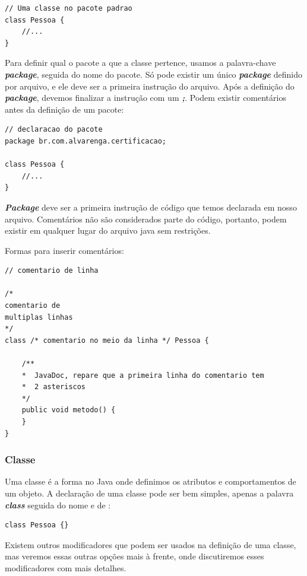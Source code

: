 \documentclass[12pt]{article}
\begin{document}
\begin{lstlisting}
// Uma classe no pacote padrao
class Pessoa {
	//...
}
\end{lstlisting}

Para definir qual o pacote a que a classe pertence, usamos a palavra-chave \textbf{\textit{package}}, seguida do nome do pacote. Só pode existir um único \textbf{\textit{package}} definido por arquivo, e ele deve ser a primeira instrução do arquivo. Após a definição do \textbf{\textit{package}}, devemos finalizar a instrução com um \textbf{\textit{;}}. Podem existir comentários antes da definição de um pacote:

\begin{lstlisting}
// declaracao do pacote
package br.com.alvarenga.certificacao;
	
class Pessoa {
	//...
}
\end{lstlisting}

\textbf{\textit{Package}} deve ser a primeira instrução de código que temos declarada em nosso arquivo. Comentários não são considerados parte do código, portanto, podem existir em qualquer lugar do arquivo java sem restrições.

Formas para inserir comentários:

\begin{lstlisting}
// comentario de linha

/*
comentario de
multiplas linhas
*/
class /* comentario no meio da linha */ Pessoa {
	
	/**
	*  JavaDoc, repare que a primeira linha do comentario tem
	*  2 asteriscos
	*/
	public void metodo() {
	}
}
\end{lstlisting}

\subsubsection{Classe}

Uma classe é a forma no Java onde definimos os atributos e comportamentos de um objeto. A declaração de uma classe pode ser bem simples, apenas a palavra \textbf{\textit{class}} seguida do nome e de \textbf{\textit{{}}}:

\begin{lstlisting}
class Pessoa {}
\end{lstlisting}

Existem outros modificadores que podem ser usados na definição de uma classe, mas veremos essas outras opções mais à frente, onde discutiremos esses modificadores com mais detalhes.
\end{document}
